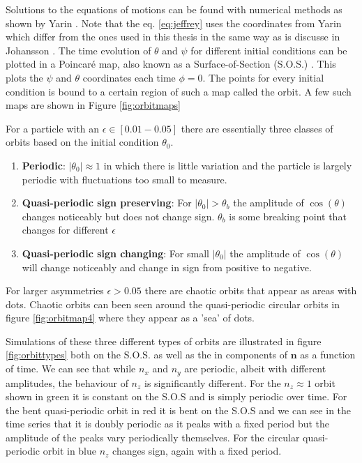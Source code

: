 Solutions to the equations of motions can be found with numerical methods as shown by Yarin \cite{Yarin}. Note that the eq. \ref{eq:jeffrey} uses the coordinates from Yarin which differ from the ones used in this thesis in the same way as is discusse in Johansson \cite{AntonThesis}. The time evolution of $\theta$ and $\psi$ for different initial conditions can be plotted in a Poincaré map, also known 
as a Surface-of-Section (S.O.S.) \cite{poincare}. This plots the $\psi$ and $\theta$ coordinates each time $\phi = 0$. The points for every initial condition is bound to a certain region of such a map called the orbit. A few such maps are shown in Figure \ref{fig:orbitmaps}

For a particle with an $\epsilon \in \left[0.01-0.05\right]$ there are essentially three classes of orbits based on the initial condition $\theta_0$.

\begin{enumerate}
\item \textbf{Periodic}: $\left|\theta_0\right| \approx 1$ in which there is little variation and the particle is largely periodic with fluctuations too small to measure.
\item \textbf{Quasi-periodic sign preserving}: For $\left|\theta_0\right|> \theta_b$ the amplitude of $\cos(\theta)$ changes noticeably but does not change sign. $\theta_b$ is some breaking point that changes for different $\epsilon$
\item \textbf{Quasi-periodic sign changing}: For small $\left|\theta_0\right|$ the amplitude of $\cos(\theta)$ will change noticeably and change in sign from positive to negative.
\end{enumerate}

For larger asymmetries $\epsilon > 0.05$ there are chaotic orbits that appear as areas with dots. Chaotic orbits can been seen around the quasi-periodic circular orbits in figure \ref{fig:orbitmap4} where they appear as a 'sea' of dots.

Simulations of these three different types of orbits are illustrated in figure \ref{fig:orbittypes} both on the S.O.S. as well as the in components of $\mathbf{n}$ as a function of time. We can see that while $n_x$ and $n_y$ are periodic, albeit with different amplitudes, the 
behaviour of $n_z$ is significantly different. For the $n_z \approx 1$  orbit shown in green it is constant on the S.O.S and is simply periodic over time. For the bent quasi-periodic orbit in red it is bent on the S.O.S and we can see in the time series that it is doubly periodic as it peaks with a fixed period but the amplitude of the peaks vary periodically themselves. For the circular quasi-periodic orbit in blue $n_z$ changes sign, again with a fixed 
period.


